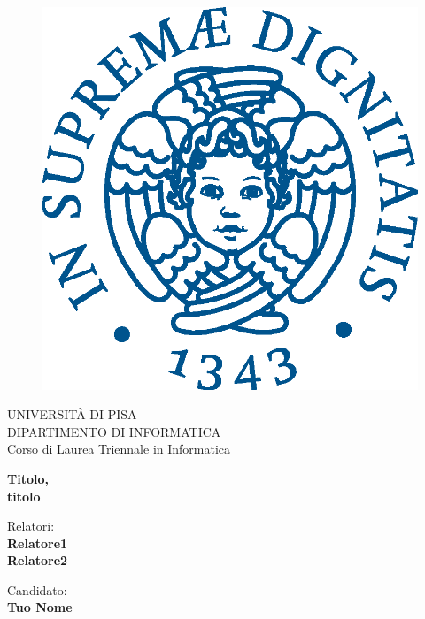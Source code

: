 \begin{titlepage}
\begin{figure}[!htb]
    \centering
    \includegraphics[keepaspectratio=true,scale=0.5]{cherubino_pant541.eps}
\end{figure}

\begin{center}
    \LARGE{UNIVERSITÀ DI PISA}
    \vspace{5mm}
    \\ \large{DIPARTIMENTO DI INFORMATICA }
    \vspace{5mm}
    \\ \LARGE{Corso di Laurea Triennale in Informatica}
\end{center}

\vspace{15mm}
\begin{center}
    {\LARGE{\bf Titolo,\\\vspace{5mm}titolo}}
\end{center}
\vspace{30mm}

\begin{minipage}[t]{0.47\textwidth}
	{\large{Relatori:}{\normalsize\vspace{3mm}
	\bf\\ \large{Relatore1 \vspace{2mm}\\Relatore2}}}
\end{minipage}
\hfill
\begin{minipage}[t]{0.47\textwidth}\raggedleft
	{\large{Candidato:}{\normalsize\vspace{3mm} \bf\\ \large{Tuo Nome\\ }}}
\end{minipage}

\vspace{30mm}
\hrulefill
\\

\end{titlepage}
